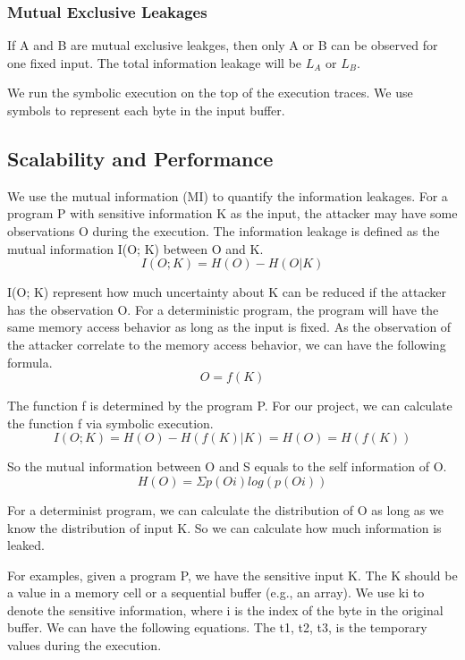 \subsubsection{Mutual Exclusive Leakages}
If A and B are mutual exclusive leakges, then only A or B can be observed for one fixed input.
The total information leakage will be $L_A$ or $L_B$.



We run the symbolic execution on the top of the execution traces. We use symbols
to represent each byte in the input buffer. 
\subsection{Scalability and Performance}

We use the mutual information (MI) to quantify the information leakages. 
For a program P with sensitive information K as the input, the attacker may have some observations O during the execution. 
The information leakage is defined as the mutual information I(O; K) between O and K.
\begin{equation}
I(O; K) = H(O) - H(O|K)
\end{equation}

I(O; K) represent how much uncertainty about K can be reduced if the attacker has the observation O.
For a deterministic program, the program will have the same memory access behavior as long as the input is fixed. 
As the observation of the attacker correlate to the memory access behavior, 
we can have the following formula.
\begin{equation}
O = f(K)
\end{equation}

The function f is determined by the program P. For our project, we can calculate the function f via symbolic execution.
\begin{equation}
I(O; K) = H(O) - H(f(K)|K) = H(O) = H(f(K))
\end{equation}

So the mutual information between O and S equals to the self information of O. 
\begin{equation}
H(O) = Σp(Oi)log(p(Oi))
\end{equation}

For a determinist program, we can calculate the distribution of O as long as we know the distribution of input K. 
So we can calculate how much information is leaked.

For examples, given a program P, we have the sensitive input K. The K should be a value in a memory cell or a sequential buffer (e.g., an array). We use ki to denote the sensitive information, where i is the index of the byte in the original buffer.  We can have the following equations. The t1, t2, t3, is the temporary values during the execution.


